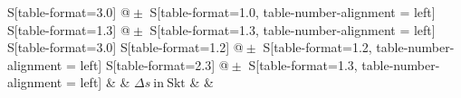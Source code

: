 \begin{table}[h!]
    \centering
    \caption{Kalium ($n=4,z=19$) -- Abschirmungszahl für jedes betrachtete Dublett, sowie bei der Berechnung verwendete Größen}
    \label{tab:Kalium}
    \begin{tabular}{
	S[table-format=3.0]
	@{${}\pm{}$}
	S[table-format=1.0, table-number-alignment = left]
	S[table-format=1.3]
	@{${}\pm{}$}
	S[table-format=1.3, table-number-alignment = left]
	S[table-format=3.0]
	S[table-format=1.2]
	@{${}\pm{}$}
	S[table-format=1.2, table-number-alignment = left]
	S[table-format=2.3]
	@{${}\pm{}$}
	S[table-format=1.3, table-number-alignment = left]
	}
	\toprule
			& 		& 
	{$\Delta s \ \mathrm{in} \ \mathrm{Skt}$}		& 		& 
			\\ 
	\midrule
    
    \bottomrule
    \end{tabular}
    \end{table}
